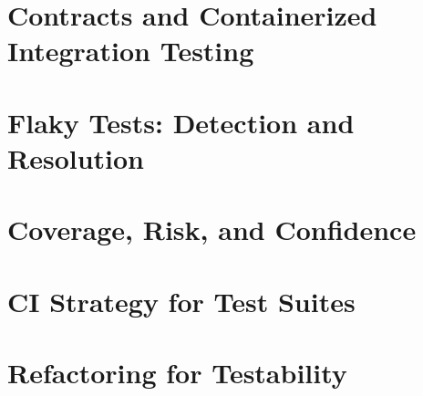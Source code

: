 \documentclass[12pt,a4paper]{book}
\begin{document}
\chapter{Contracts and Containerized Integration Testing}


\chapter{Flaky Tests: Detection and Resolution}


\chapter{Coverage, Risk, and Confidence}


\chapter{CI Strategy for Test Suites}


\chapter{Refactoring for Testability}


\backmatter




\printindex
\end{document}
